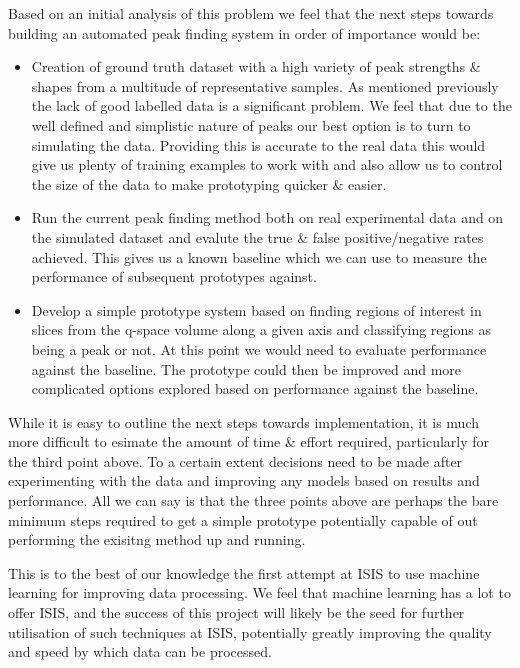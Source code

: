 \documentclass[paper=a4, fontsize=8pt]{scrartcl} \usepackage[T1]{fontenc}
\begin{document}
Based on an initial analysis of this problem we feel that the next steps towards 
building an automated peak finding system in order of importance would be:

\begin{itemize}

\item Creation of ground truth dataset with a high variety of peak strengths \& shapes 
    from a multitude of representative samples. As mentioned previously the lack of good labelled
    data is a significant problem. We feel that due to the well defined and simplistic nature of 
    peaks our best option is to turn to simulating the data. Providing this is accurate to the 
    real data this would give us plenty of training examples to work with and also allow us
    to control the size of the data to make prototyping quicker \& easier.

\item Run the current peak finding method both on real experimental data and 
    on the simulated dataset and evalute the true \& false positive/negative rates achieved.
    This gives us a known baseline which we can use to measure the performance of subsequent
    prototypes against.

\item Develop a simple prototype system based on finding regions of interest in 
    slices from the q-space volume along a given axis and classifying regions as
    being a peak or not. At this point we would need to evaluate performance against
    the baseline. The prototype could then be improved and more complicated
    options explored based on performance against the baseline.

\end{itemize}

While it is easy to outline the next steps towards implementation, it is much more 
difficult to esimate the amount of time \& effort required, particularly for the 
third point above. To a certain extent decisions need to be made after experimenting
with the data and improving any models based on results and performance. All we can say
is that the three points above are perhaps the bare minimum steps required to get a simple
prototype potentially capable of out performing the exisitng method up and running.

This is to the best of our knowledge the first attempt at ISIS to use machine 
learning for improving data processing. We feel that machine learning has a lot to offer ISIS, 
and the success of this project will likely be the seed for further utilisation of such
techniques at ISIS, potentially greatly improving the quality and speed by which data
can be processed.


 
\end{document}
